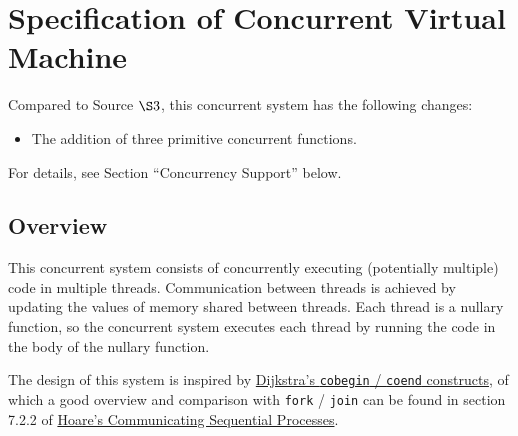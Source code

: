 
\newcommand{\qed}{$\Box$}
\newcommand{\Rule}[2]{\genfrac{}{}{0.7pt}{}{{\setlength{\fboxrule}{0pt}\setlength{\fboxsep}{3mm}\fbox{$#1$}}}{{\setlength{\fboxrule}{0pt}\setlength{\fboxsep}{3mm}\fbox{$#2$}}}}
\newcommand{\Rulee}[3]{\genfrac{}{}{0.7pt}{}{{\setlength{\fboxrule}{0pt}\setlength{\fboxsep}{3mm}\fbox{$#1$}}}{{\setlength{\fboxrule}{0pt}\setlength{\fboxsep}{3mm}\fbox{$#2$}}}[#3]}
\newcommand{\transition}{\rightrightarrows_s}
\newcommand{\translate}{\twoheadrightarrow}
\newcommand{\translateaux}{\hookrightarrow}
\author{koo}
\date{\today}
\title{}





\section{Specification of Concurrent Virtual Machine}
\label{sec:orgc6ebafc}
Compared to Source \(\S 3\), this concurrent system has the following changes:
\begin{itemize}
\item The addition of three primitive concurrent functions.
\end{itemize}
For details, see Section ``Concurrency Support'' below.

\subsection{Overview}
\label{sec:orgf0735e6}
This concurrent system consists of concurrently executing (potentially multiple) code in multiple threads. Communication between threads is achieved by updating the values of memory shared between threads. Each thread is a nullary function, so the concurrent system executes each thread by running the code in the body of the nullary function.

The design of this system is inspired by \href{https://doi.org/10.1007/978-1-4757-3472-0\_2}{Dijkstra's \texttt{cobegin} / \texttt{coend} constructs}, of which a good overview and comparison with \texttt{fork} / \texttt{join} can be found in section 7.2.2 of \href{https://doi.org/10.1145/359576.359585}{Hoare's Communicating Sequential Processes}.

